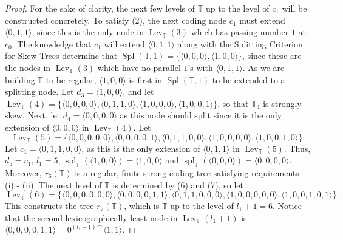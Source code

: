 \documentclass{amsart}
\theoremstyle{remark}
\theoremstyle{definition}
\theoremstyle{remark}
\DeclareMathOperator{\Spl}{Spl}
\DeclareMathOperator{\spl}{spl}
\DeclareMathOperator{\Lev}{Lev}
\newcommand{\bT}{\mathbb{T}}
\newcommand{\lgl}{\langle}
\newcommand{\rgl}{\rangle}
\begin{document}
\begin{proof}
For the sake of clarity,
the next few levels of $\bT$ up to the level of $c_1$ will be constructed concretely.
To satisfy (2),
the next coding node $c_1$  must  extend $\lgl 0,1,1\rgl$,
 since this is the only node in $\Lev_{\bT}(3)$ which has passing number $1$ at $c_0$.
The knowledge that $c_1$ will extend  $\lgl 0,1,1\rgl$  along with the Splitting Criterion for Skew Trees
determine that
  $\Spl(\bT,1)=\{\lgl 0,0,0\rgl, \lgl 1,0,0\rgl\}$,
 since these are the nodes in
$\Lev_{\bT}(3)$
which have no parallel $1$'s with
$\lgl 0,1,1\rgl$.
As we are building $\bT$ to be regular,
 $\lgl 1,0,0\rgl$ is  first in  $\Spl(\bT,1)$
 to be extended to a splitting node.
Let $d_3=\lgl 1,0,0\rgl$,
and let  $\Lev_{\bT}(4)=\{\lgl 0,0,0,0\rgl, \lgl 0,1,1,0\rgl,\lgl 1,0,0,0\rgl,\lgl 1,0,0,1\rgl\}$, so that $\bT_4$ is strongly skew.
Next, let $d_4=\lgl 0,0,0,0\rgl$ as this node should split since it is the only extension of $\lgl 0,0,0\rgl$ in $\Lev_{\bT}(4)$.
Let
\begin{equation}
\Lev_{\bT}(5)=
\{\lgl 0,0,0,0,0\rgl, \lgl 0,0,0,0,1\rgl,\lgl 0,1,1,0,0\rgl,\lgl 1,0,0,0,0\rgl,\lgl 1,0,0,1,0\rgl\}.
\end{equation}
Let $c_1=\lgl 0,1,1,0,0\rgl$, as this is
the only extension of $\lgl 0,1,1\rgl$ in  $\Lev_{\bT}(5)$.
Thus, $d_5=c_1$,
$l_1=5$, $\spl_{\bT}(\lgl 1,0,0\rgl)=\lgl 1,0,0\rgl$
and $\spl_{\bT}(\lgl 0,0,0\rgl)=\lgl 0,0,0,0\rgl$.
Moreover,
$r_6(\bT)$
 is  a regular,  finite strong coding tree satisfying requirements  (i) - (ii).
The next level of $\bT$  is determined by (6) and (7), so
let
\begin{equation}
\Lev_{\bT}(6) =\{\lgl 0,0,0,0,0,0\rgl, \lgl 0,0,0,0,1,1\rgl,\lgl 0,1,1,0,0,0\rgl,\lgl 1,0,0,0,0,0\rgl,\lgl 1,0,0,1,0,1\rgl\}.
\end{equation}
This  constructs the tree  $r_7(\bT)$,
which is $\bT$ up to the level of $l_1+1=6$.
Notice that the second lexicographically least node in $\Lev_{\bT}(l_1+1)$ is
$\lgl 0,0,0,0,1,1\rgl={0^{(l_{1}-1)}}^{\frown}\lgl 1,1\rgl$.



\end{proof}
\end{document}
